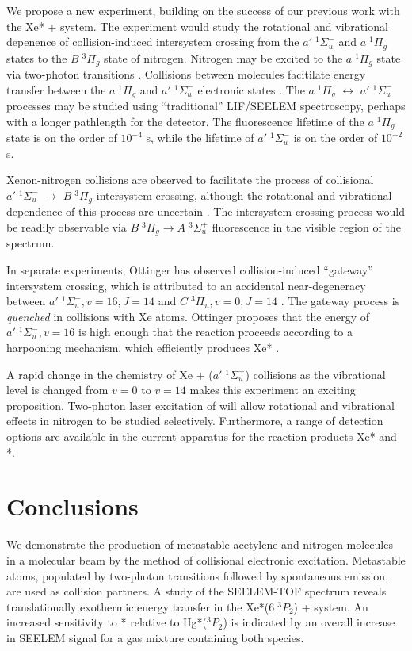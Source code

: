 We propose a new experiment, building on the success of our previous
work with the Xe* +  system.  The experiment would study the
rotational and vibrational depenence of collision-induced intersystem
crossing from the $a' \; ^1\Sigma_u^-$ and $a \; ^1\Pi_g$ states to
the $B \; ^3\Pi_g$ state of nitrogen.  Nitrogen may be excited to the
$a \; ^1\Pi_g$ state via two-photon transitions \cite{vanveen82}.
Collisions between  molecules facitilate energy transfer
between the $a \; ^1\Pi_g$ and $a' \; ^1\Sigma_u^-$ electronic states
\cite{marinelli88}.  The $a \; ^1\Pi_g$ $\leftrightarrow$ $a' \;
^1\Sigma_u^-$ processes may be studied using ``traditional''
LIF/SEELEM spectroscopy, perhaps with a longer pathlength for the
detector.  The fluorescence lifetime of the $a \; ^1\Pi_g$ state is on
the order of $10^{-4}$ s, while the lifetime of $a' \; ^1\Sigma_u^-$
is on the order of $10^{-2}$ s.

Xenon-nitrogen collisions are observed to facilitate the process of
collisional $a' \; ^1\Sigma_u^-$ $\rightarrow$ $B \; ^3\Pi_g$
intersystem crossing, although the rotational and vibrational
dependence of this process are uncertain \cite{umemoto03a}.  The
intersystem crossing process would be readily observable via $B \;
^3\Pi_g \rightarrow A \; ^3\Sigma_u^+$ fluorescence in the visible
region of the spectrum.

In separate experiments, Ottinger has observed collision-induced
``gateway'' intersystem crossing, which is attributed to an accidental
near-degeneracy between $a' \; ^1\Sigma_u^-, v=16, J=14$ and $C \;
^3\Pi_u, v=0, J=14$ \cite{ottinger98}.  The gateway process is
\emph{quenched} in collisions with Xe atoms.  Ottinger proposes that
the energy of $a' \; ^1\Sigma_u^-, v=16$ is high enough that the
reaction proceeds according to a harpooning mechanism, which
efficiently produces Xe* \cite{ottinger98}.

A rapid change in the chemistry of Xe + ($a' \; ^1\Sigma_u^-$)
collisions as the vibrational level is changed from $v=0$ to $v=14$
makes this experiment an exciting proposition.  Two-photon laser
excitation of  will allow rotational and vibrational effects in
nitrogen to be studied selectively.  Furthermore, a range of detection
options are available in the current apparatus for the reaction
products Xe* and *.

\section{Conclusions}

We demonstrate the production of metastable acetylene and nitrogen
molecules in a molecular beam by the method of collisional electronic
excitation.  Metastable atoms, populated by two-photon transitions
followed by spontaneous emission, are used as collision partners.  A
study of the SEELEM-TOF spectrum reveals translationally exothermic
energy transfer in the Xe*($6 \; ^3P_2$) +  system.  An
increased sensitivity to * relative to Hg*($^3P_2$) is
indicated by an overall increase in SEELEM signal for a gas mixture
containing both species.

%  
% 
% 